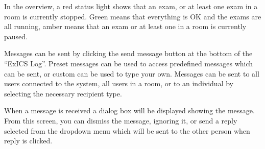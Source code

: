 In the overview, a red status light shows that an exam, or at least one exam in a room is currently stopped.  Green means that everything is OK and the exams are all running, amber means that an exam or at least one in a room is currently paused.

Messages can be sent by clicking the send message button at the bottom of the ``ExICS Log''.  Preset messages can be used to access predefined messages which can be sent, or custom can be used to type your own.  Messages can be sent to all users connected to the system, all users in a room, or to an individual by selecting the necessary recipient type.

When a message is received a dialog box will be displayed showing the message.  From this screen, you can dismiss the message, ignoring it, or send a reply selected from the dropdown menu which will be sent to the other person when reply is clicked.